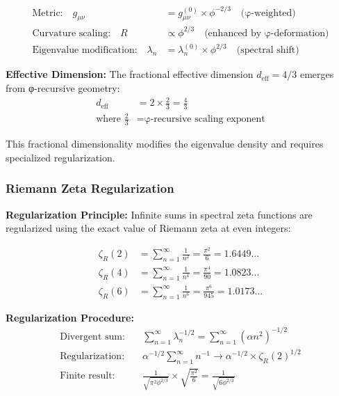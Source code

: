 \begin{align}
\text{Metric:} \quad g_{\mu\nu} &= g_{\mu\nu}^{(0)} \times \phi^{-2/3} \quad \text{(φ-weighted)} \\
\text{Curvature scaling:} \quad R &\propto \phi^{2/3} \quad \text{(enhanced by φ-deformation)} \\
\text{Eigenvalue modification:} \quad \lambda_n &= \lambda_n^{(0)} \times \phi^{2/3} \quad \text{(spectral shift)}
\end{align}

\textbf{Effective Dimension:} The fractional effective dimension $d_{\text{eff}} = 4/3$ emerges from φ-recursive geometry:
\begin{align}
d_{\text{eff}} &= 2 \times \frac{2}{3} = \frac{4}{3} \\
\text{where } \frac{2}{3} &= \text{φ-recursive scaling exponent}
\end{align}

This fractional dimensionality modifies the eigenvalue density and requires specialized regularization.

\subsubsection{Riemann Zeta Regularization}

\textbf{Regularization Principle:} Infinite sums in spectral zeta functions are regularized using the exact value of Riemann zeta at even integers:

\begin{align}
\zeta_R(2) &= \sum_{n=1}^{\infty} \frac{1}{n^2} = \frac{\pi^2}{6} = 1.6449... \\
\zeta_R(4) &= \sum_{n=1}^{\infty} \frac{1}{n^4} = \frac{\pi^4}{90} = 1.0823... \\
\zeta_R(6) &= \sum_{n=1}^{\infty} \frac{1}{n^6} = \frac{\pi^6}{945} = 1.0173...
\end{align}

\textbf{Regularization Procedure:}
\begin{align}
\text{Divergent sum:} \quad &\sum_{n=1}^{\infty} \lambda_n^{-1/2} = \sum_{n=1}^{\infty} (\alpha n^2)^{-1/2} \\
\text{Regularization:} \quad &\alpha^{-1/2} \sum_{n=1}^{\infty} n^{-1} \to \alpha^{-1/2} \times \zeta_R(2)^{1/2} \\
\text{Finite result:} \quad &\frac{1}{\sqrt{\pi^2 \phi^{2/3}}} \times \sqrt{\frac{\pi^2}{6}} = \frac{1}{\sqrt{6\phi^{2/3}}}
\end{align}

